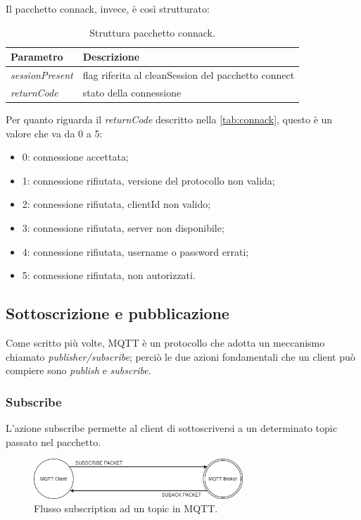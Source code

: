 \documentclass[binding=0.6cm,TFA]{sapthesis}
\begin{document}
\begin{large}
Il pacchetto connack, invece, è così strutturato: \\
\begin{table}[h]
\caption{Struttura pacchetto connack.}
\label{tab:connack}
\begin{tabular}{lp{}}
\toprule
\textbf{Parametro} & \textbf{Descrizione} \\
\midrule
\textit{sessionPresent} & flag riferita al cleanSession del pacchetto connect \\
\textit{returnCode} & stato della connessione \\
\bottomrule
\end{tabular}
\end{table}

Per quanto riguarda il \textit{returnCode} descritto nella \autoref{tab:connack}, questo è un valore che va da 0 a 5:
\begin{itemize}
\item 0: connessione accettata;
\item 1: connessione rifiutata, versione del protocollo non valida;
\item 2: connessione rifiutata, clientId non valido;
\item 3: connessione rifiutata, server non disponibile;
\item 4: connessione rifiutata, username o password errati;
\item 5: connessione rifiutata, non autorizzati.
\end{itemize}

\subsection{Sottoscrizione e pubblicazione}
Come scritto più volte, MQTT è un protocollo che adotta un meccanismo chiamato \textit{publisher/subscribe}; perciò le due azioni fondamentali che un client può compiere sono \textit{publish} e \textit{subscribe}.
\subsubsection{Subscribe}
L'azione subscribe permette al client di sottoscriversi a un determinato topic passato nel pacchetto.

\begin{figure}[h]
\centering
\includegraphics[width=0.7\textwidth]{images/subscribe-suback.png}
\caption{Flusso subscription ad un topic in MQTT.}
\label{fig:subscribe-suback}
\end{figure}


\end{large}
\end{document}
